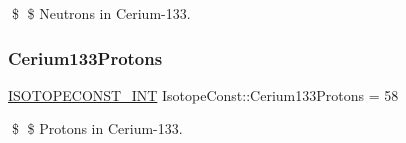 \$ \$ Neutrons in Cerium-\/133. \mbox{\label{group___isotope_const-_cerium-_ce133_ga7ab412da70cf908adf40b7d464cd802d}} 
\subsubsection{\texorpdfstring{Cerium133\+Protons}{Cerium133Protons}}
{\footnotesize\ttfamily \mbox{\hyperlink{group___isotope_const-_macros_ga5f18360b3e99483a35c32d789e62621c}{I\+S\+O\+T\+O\+P\+E\+C\+O\+N\+S\+T\+\_\+\+I\+NT}} Isotope\+Const\+::\+Cerium133\+Protons = 58}

\$ \$ Protons in Cerium-\/133. 